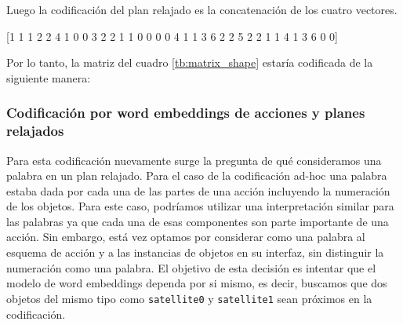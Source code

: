Luego la codificación del plan relajado es la concatenación de los cuatro
vectores.

\begin{center}
    [1 1 1 2 2 4 1 0 0 3 2 2 1 1 0 0 0 0 4 1 1 3 6 2 2 5 2 2 1 1 4 1 3 6 0 0]
\end{center}

Por lo tanto, la matriz del cuadro \ref{tb:matrix_shape} estaría codificada de
la siguiente manera:

\begin{table}[h!]
\centering
{}
 \caption{Planes relajados y acciones etiquetadas usando codificación ad-hoc.}
 \label{tb:matrix_shape_ohe}
\end{table}

\subsubsection{Codificación por word embeddings de acciones y planes relajados}

Para esta codificación nuevamente surge la pregunta de qué consideramos una
palabra en un plan relajado. Para el caso de la codificación ad-hoc una palabra
estaba dada por cada una de las partes de una acción incluyendo la numeración de
los objetos. Para este caso, podríamos utilizar una interpretación similar para
las palabras ya que cada una de esas componentes son parte importante de una
acción. Sin embargo, está vez optamos por considerar como una palabra al esquema
de acción y a las instancias de objetos en su interfaz, sin distinguir la
numeración como una palabra. El objetivo de esta decisión es intentar que el
modelo de word embeddings dependa por si mismo, es decir, buscamos que dos
objetos del mismo tipo como \verb|satellite0| y \verb|satellite1| sean próximos
en la codificación.

